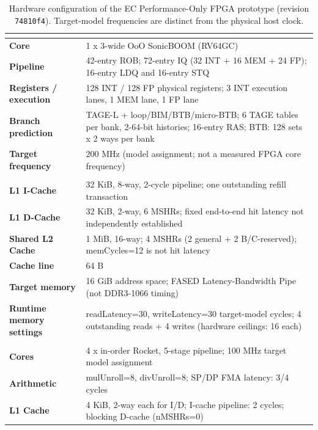 \begin{table}[t]
\centering
\scriptsize
\caption{Hardware configuration of the EC Performance-Only FPGA prototype (revision \texttt{74810f4}). Target-model frequencies are distinct from the physical host clock.}
\label{tab:ec-hardware-config}
\setlength{\tabcolsep}{3pt}
\begin{tabularx}{\columnwidth}{@{}>{\bfseries}p{}X@{}}
\hline
\multicolumn{2}{c}{\textbf{Big Core}} \\ \hline
Core & 1 x 3-wide OoO SonicBOOM (RV64GC) \\
Pipeline & 42-entry ROB; 72-entry IQ (32 INT + 16 MEM + 24 FP); 16-entry LDQ and 16-entry STQ \\
Registers / execution & 128 INT / 128 FP physical registers; 3 INT execution lanes, 1 MEM lane, 1 FP lane \\
Branch prediction & TAGE-L + loop/BIM/BTB/micro-BTB; 6 TAGE tables per bank, 2-64-bit histories; 16-entry RAS; BTB: 128 sets x 2 ways per bank \\
Target frequency & 200 MHz (model assignment; not a measured FPGA core frequency) \\
\hline
\multicolumn{2}{c}{\textbf{Memory Hierarchy}} \\ \hline
L1 I-Cache & 32 KiB, 8-way, 2-cycle pipeline; one outstanding refill transaction \\
L1 D-Cache & 32 KiB, 2-way, 6 MSHRs; fixed end-to-end hit latency not independently established \\
Shared L2 Cache & 1 MiB, 16-way; 4 MSHRs (2 general + 2 B/C-reserved); memCycles=12 is not hit latency \\
Cache line & 64 B \\
Target memory & 16 GiB address space; FASED Latency-Bandwidth Pipe (not DDR3-1066 timing) \\
Runtime memory settings & readLatency=30, writeLatency=30 target-model cycles; 4 outstanding reads + 4 writes (hardware ceilings: 16 each) \\
\hline
\multicolumn{2}{c}{\textbf{Little Cores}} \\ \hline
Cores & 4 x in-order Rocket, 5-stage pipeline; 100 MHz target model assignment \\
Arithmetic & mulUnroll=8, divUnroll=8; SP/DP FMA latency: 3/4 cycles \\
L1 Cache & 4 KiB, 2-way each for I/D; I-cache pipeline: 2 cycles; blocking D-cache (nMSHRs=0) \\

\end{tabularx}
\end{table}
